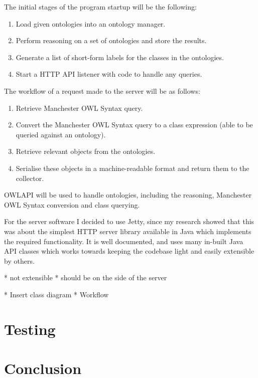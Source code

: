 \documentclass{article}
\begin{document}
The initial stages of the program startup will be the following:

\begin{enumerate}
    \item Load given ontologies into an ontology manager. 
    \item Perform reasoning on a set of ontologies and store the results.
    \item Generate a list of short-form labels for the classes in the
    ontologies.
    \item Start a HTTP API listener with code to handle any queries.
\end{enumerate}

The workflow of a request made to the server will be as follows:

\begin{enumerate}
    \item Retrieve Manchester OWL Syntax query.
    \item Convert the Manchester OWL Syntax query to a class expression (able to
    be queried against an ontology).
    \item Retrieve relevant objects from the ontologies.
    \item Serialise these objects in a machine-readable format and return them 
    to the collector.
\end{enumerate}

OWLAPI will be used to handle ontologies, including the reasoning, Manchester
OWL Syntax conversion and class querying. 

For the server software I decided to use Jetty, since my research showed that
this was about the simplest HTTP server library available in Java which
implements the required functionality. It is well documented, and uses many
in-built Java API classes which works towards keeping the codebase light and
easily extensible by others. 

* not extensible
* should be on the side of the server

* Insert class diagram
* Workflow

\section{Testing}

\section{Conclusion}
\end{document}
